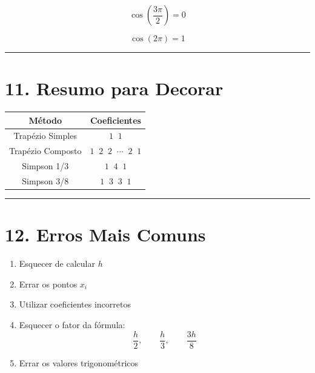 \documentclass[12pt,a4paper]{article}
\begin{document}
\[
\cos\left(\frac{3\pi}{2}\right)=0
\]

\[
\cos(2\pi)=1
\]

\hrule

\section*{11. Resumo para Decorar}

\begin{center}
\begin{tabular}{cc}
\toprule
Método & Coeficientes \\
\midrule
Trapézio Simples & $1 \;\; 1$ \\
Trapézio Composto & $1 \;\; 2 \;\; 2 \;\; \cdots \;\; 2 \;\; 1$ \\
Simpson 1/3 & $1 \;\; 4 \;\; 1$ \\
Simpson 3/8 & $1 \;\; 3 \;\; 3 \;\; 1$ \\
\bottomrule
\end{tabular}
\end{center}

\hrule

\section*{12. Erros Mais Comuns}

\begin{enumerate}
\item Esquecer de calcular \(h\)
\item Errar os pontos \(x_i\)
\item Utilizar coeficientes incorretos
\item Esquecer o fator da fórmula:
\[
\frac{h}{2},
\qquad
\frac{h}{3},
\qquad
\frac{3h}{8}
\]
\item Errar os valores trigonométricos
\end{enumerate}
\end{document}
